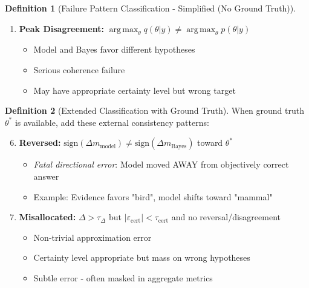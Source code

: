 \documentclass{article}
\DeclareMathOperator*{\argmax}{arg\,max}
\theoremstyle{definition}
\newtheorem{definition}{Definition}
\begin{document}
\begin{definition}[Failure Pattern Classification - Simplified (No Ground Truth)]
\begin{enumerate}
    \item \textbf{Peak Disagreement:} $\argmax_{\theta} q(\theta|y) \neq \argmax_{\theta} p(\theta|y)$
    \begin{itemize}
        \item Model and Bayes favor different hypotheses
        \item Serious coherence failure
        \item May have appropriate certainty level but wrong target
    \end{itemize}
\end{enumerate}
\end{definition}

\begin{definition}[Extended Classification with Ground Truth]
When ground truth $\theta^*$ is available, add these external consistency patterns:

\begin{enumerate}
    \setcounter{enumi}{5}
    \item \textbf{Reversed:} $\text{sign}(\Delta m_{\text{model}}) \neq \text{sign}(\Delta m_{\text{Bayes}})$ toward $\theta^*$
    \begin{itemize}
        \item \emph{Fatal directional error}: Model moved AWAY from objectively correct answer
        \item Example: Evidence favors "bird", model shifts toward "mammal"
    \end{itemize}

    \item \textbf{Misallocated:} $\Delta > \tau_{\Delta}$ but $|\varepsilon_{\text{cert}}| < \tau_{\text{cert}}$ and no reversal/disagreement
    \begin{itemize}
        \item Non-trivial approximation error
        \item Certainty level appropriate but mass on wrong hypotheses
        \item Subtle error - often masked in aggregate metrics
    \end{itemize}
\end{enumerate}
\end{definition}
\end{document}
